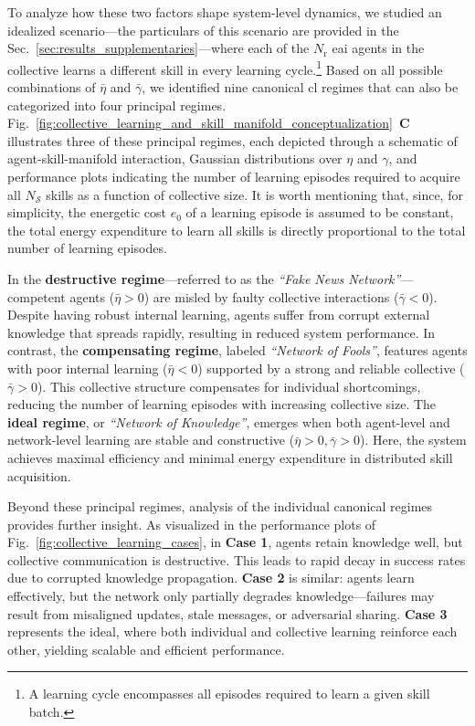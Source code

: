 \documentclass[12pt]{article}
\renewcommand{\emph}[1]{\textit{#1}}
\begin{document}
To analyze how these two factors shape system-level dynamics, we studied an idealized scenario---the particulars of this scenario are provided in the  Sec.~\ref{sec:results_supplementaries}---where each of the $N_\mathrm{r}$ \ac{eai} agents in the collective learns a different skill in every learning cycle.\footnote{A learning cycle encompasses all episodes required to learn a given skill batch.} Based on all possible combinations of $\bar{\eta}$ and $\bar{\gamma}$, we identified nine canonical \ac{cl} regimes that can also be categorized into four principal regimes. Fig.~\ref{fig:collective_learning_and_skill_manifold_conceptualization}~\textbf{C} illustrates three of these principal regimes, each depicted through a schematic of agent-skill-manifold interaction, Gaussian distributions over $\eta$ and $\gamma$, and performance plots indicating the number of learning episodes required to acquire all $N_\mathcal{S}$ skills as a function of collective size. It is worth mentioning that, since, for simplicity, the energetic cost $ e_0 $ of a learning episode is assumed to be constant, the total energy expenditure to learn all skills is directly proportional to the total number of learning episodes.

In the \textbf{destructive regime}---referred to as the \emph{``Fake News Network''}---competent agents ($\bar{\eta} > 0$) are misled by faulty collective interactions ($\bar{\gamma} < 0$). Despite having robust internal learning, agents suffer from corrupt external knowledge that spreads rapidly, resulting in reduced system performance. In contrast, the \textbf{compensating regime}, labeled \emph{``Network of Fools''}, features agents with poor internal learning ($\bar{\eta} < 0$) supported by a strong and reliable collective ($\bar{\gamma} > 0$). This collective structure compensates for individual shortcomings, reducing the number of learning episodes with increasing collective size. The \textbf{ideal regime}, or \emph{``Network of Knowledge''}, emerges when both agent-level and network-level learning are stable and constructive ($\bar{\eta} > 0, \bar{\gamma} > 0$). Here, the system achieves maximal efficiency and minimal energy expenditure in distributed skill acquisition.

Beyond these principal regimes, analysis of the individual canonical regimes provides further insight. As visualized in the performance plots of Fig.~\ref{fig:collective_learning_cases}, in \textbf{Case 1}, agents retain knowledge well, but collective communication is destructive. This leads to rapid decay in success rates due to corrupted knowledge propagation. \textbf{Case 2} is similar: agents learn effectively, but the network only partially degrades knowledge—failures may result from misaligned updates, stale messages, or adversarial sharing. \textbf{Case 3} represents the ideal, where both individual and collective learning reinforce each other, yielding scalable and efficient performance. 
\end{document}
